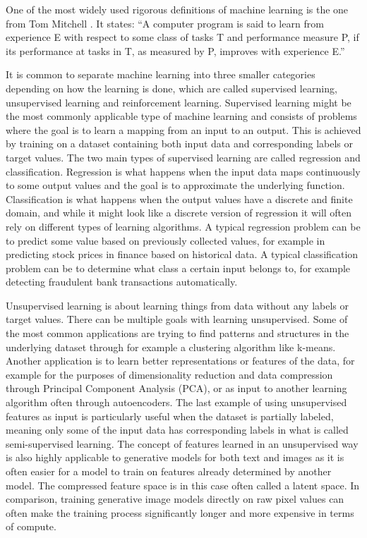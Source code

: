 One of the most widely used rigorous definitions of machine learning is the one from Tom Mitchell \cite{mitchellmachinelearning}. It states: ``A computer program is said to learn from experience E with respect to some class of tasks T and performance measure P, if its performance at tasks in T, as measured by P, improves with experience E.''

It is common to separate machine learning into three smaller categories depending on how the learning is done, which are called supervised learning, unsupervised learning and reinforcement learning. Supervised learning might be the most commonly applicable type of machine learning and consists of problems where the goal is to learn a mapping from an input to an output. This is achieved by training on a dataset containing both input data and corresponding labels or target values. The two main types of supervised learning are called regression and classification. Regression is what happens when the input data maps continuously to some output values and the goal is to approximate the underlying function. Classification is what happens when the output values have a discrete and finite domain, and while it might look like a discrete version of regression it will often rely on different types of learning algorithms. A typical regression problem can be to predict some value based on previously collected values, for example in predicting stock prices in finance based on historical data. A typical classification problem can be to determine what class a certain input belongs to, for example detecting fraudulent bank transactions automatically.

Unsupervised learning is about learning things from data without any labels or target values. There can be multiple goals with learning unsupervised. Some of the most common applications are trying to find patterns and structures in the underlying dataset through for example a clustering algorithm like k-means. Another application is to learn better representations or features of the data, for example for the purposes of dimensionality reduction and data compression through Principal Component Analysis (PCA), or as input to another learning algorithm often through autoencoders. The last example of using unsupervised features as input is particularly useful when the dataset is partially labeled, meaning only some of the input data has corresponding labels in what is called semi-supervised learning. The concept of features learned in an unsupervised way is also highly applicable to generative models for both text \cite{gpt3} and images \cite{stablediffusion} as it is often easier for a model to train on features already determined by another model. The compressed feature space is in this case often called a latent space. In comparison, training generative image models directly on raw pixel values can often make the training process significantly longer and more expensive in terms of compute.

